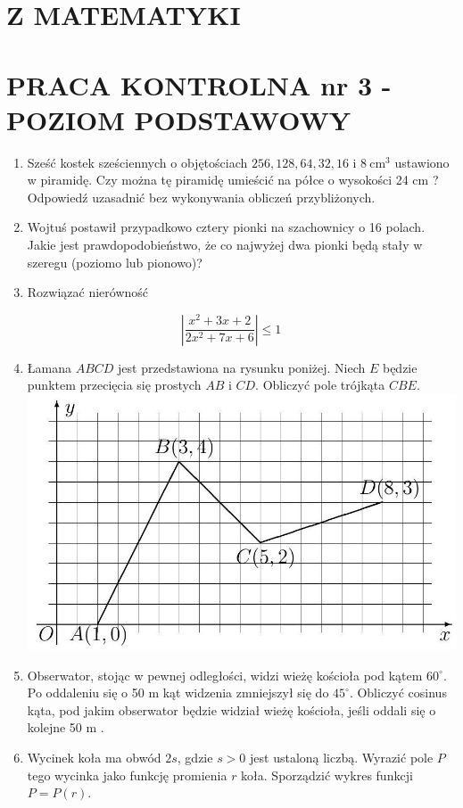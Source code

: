 \documentclass[10pt]{article}
\begin{document}
\section*{Z MATEMATYKI}
\section*{PRACA KONTROLNA nr 3 -POZIOM PODSTAWOWY}
\begin{enumerate}
  \item Sześć kostek sześciennych o objętościach $256,128,64,32,16$ i $8 \mathrm{~cm}^{3}$ ustawiono w piramidę. Czy można tę piramidę umieścić na półce o wysokości 24 cm ? Odpowiedź uzasadnić bez wykonywania obliczeń przybliżonych.
  \item Wojtuś postawił przypadkowo cztery pionki na szachownicy o 16 polach. Jakie jest prawdopodobieństwo, że co najwyżej dwa pionki będą stały w szeregu (poziomo lub pionowo)?
  \item Rozwiązać nierówność
\end{enumerate}

$$
\left|\frac{x^{2}+3 x+2}{2 x^{2}+7 x+6}\right| \leqslant 1
$$

\begin{enumerate}
  \setcounter{enumi}{3}
  \item Łamana $A B C D$ jest przedstawiona na rysunku poniżej. Niech $E$ będzie punktem przecięcia się prostych $A B$ i $C D$. Obliczyć pole trójkąta $C B E$.\\
\includegraphics[max width=\textwidth, center]{2024_11_16_c963f0dc5e06cccea777g-05}
  \item Obserwator, stojąc w pewnej odległości, widzi wieżę kościoła pod kątem $60^{\circ}$. Po oddaleniu się o 50 m kąt widzenia zmniejszył się do $45^{\circ}$. Obliczyć cosinus kąta, pod jakim obserwator będzie widział wieżę kościoła, jeśli oddali się o kolejne 50 m .
  \item Wycinek koła ma obwód $2 s$, gdzie $s>0$ jest ustaloną liczbą. Wyrazić pole $P$ tego wycinka jako funkcję promienia $r$ koła. Sporządzić wykres funkcji $P=P(r)$.
\end{enumerate}
\end{document}
